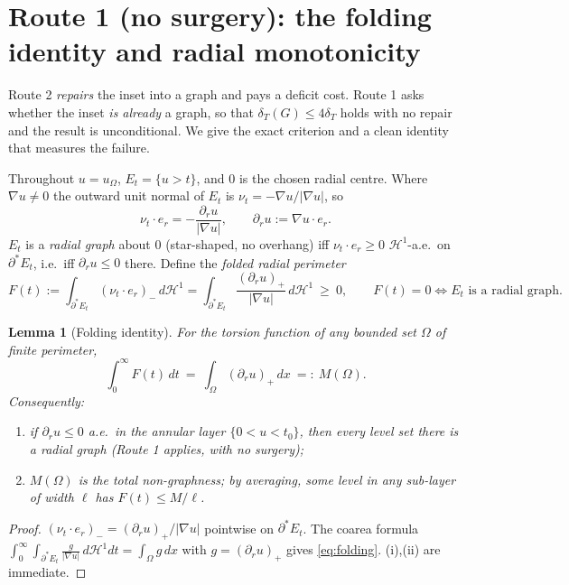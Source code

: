 \documentclass[11pt]{article}
\newtheorem{lemma}[theorem]{Lemma}
\theoremstyle{definition}
\newcommand{\Om}{\Omega}
\newcommand{\HH}{\mathcal H}
\newcommand{\dT}{\delta_T}
\begin{document}
\section{Route 1 (no surgery): the folding identity and radial monotonicity}
\label{sec:route1}

Route 2 \emph{repairs} the inset into a graph and pays a deficit cost.
Route 1 asks whether the inset \emph{is already} a graph, so that
$\dT(G)\le 4\dT$ holds with no repair and the result is unconditional. We
give the exact criterion and a clean identity that measures the failure.

Throughout $u=u_\Om$, $E_t=\{u>t\}$, and $0$ is the chosen radial centre.
Where $\nabla u\ne0$ the outward unit normal of $E_t$ is
$\nu_t=-\nabla u/|\nabla u|$, so
\[
   \nu_t\cdot e_r=-\frac{\partial_r u}{|\nabla u|},
   \qquad \partial_r u:=\nabla u\cdot e_r .
\]
$E_t$ is a \emph{radial graph} about $0$ (star-shaped, no overhang) iff
$\nu_t\cdot e_r\ge0$ $\HH^1$-a.e.\ on $\partial^*E_t$, i.e.\ iff
$\partial_r u\le0$ there. Define the \emph{folded radial perimeter}
\[
   F(t):=\int_{\partial^*E_t}(\nu_t\cdot e_r)_-\,d\HH^1
        =\int_{\partial^*E_t}\frac{(\partial_r u)_+}{|\nabla u|}\,d\HH^1
        \ \ge\ 0,
   \qquad F(t)=0\iff E_t\text{ is a radial graph.}
\]

\begin{lemma}[Folding identity]\label{lem:folding}
For the torsion function of any bounded set $\Om$ of finite perimeter,
\begin{equation}\label{eq:folding}
   \int_0^{\infty}F(t)\,dt\ =\ \int_\Om(\partial_r u)_+\,dx\ =:\ M(\Om).
\end{equation}
Consequently:
\begin{enumerate}[label=\textup{(\roman*)},leftmargin=2.2em]
\item if $\partial_r u\le0$ a.e.\ in the annular layer
$\{0<u<t_0\}$, then \emph{every} level set there is a radial graph
\textup{(}Route 1 applies, with no surgery\textup{)};
\item $M(\Om)$ is the total non-graphness; by averaging, some level in any
sub-layer of width $\ell$ has $F(t)\le M/\ell$.
\end{enumerate}
\end{lemma}

\begin{proof}
$(\nu_t\cdot e_r)_-=(\partial_r u)_+/|\nabla u|$ pointwise on
$\partial^*E_t$. The coarea formula
$\int_0^\infty\!\int_{\partial^*E_t}\!\frac{g}{|\nabla u|}\,d\HH^1dt=
\int_\Om g\,dx$ with $g=(\partial_r u)_+$ gives \eqref{eq:folding}. (i),(ii)
are immediate.
\end{proof}
\end{document}
